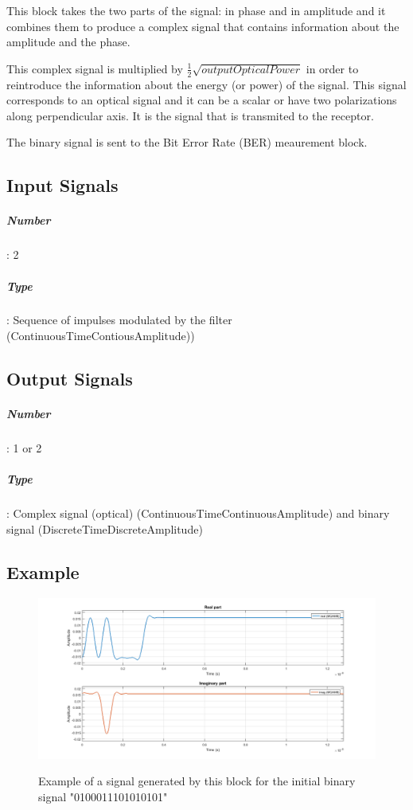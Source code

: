 \documentclass[a4paper]{article}
\begin{document}
This block takes the two parts of the signal: in phase and in amplitude and it combines them to produce a complex signal that contains information about the amplitude and the phase.

This complex signal is multiplied by $\frac{1}{2}\sqrt{\textit{outputOpticalPower}}$ in order to reintroduce the information about the energy (or power) of the signal. This signal corresponds to an optical signal and it can be a scalar or have two polarizations along perpendicular axis. It is the signal that is transmited to the receptor. 

The binary signal is sent to the Bit Error Rate (BER) meaurement block.

\subsection*{Input Signals}

\subparagraph*{Number}: 2

\subparagraph*{Type}: Sequence of impulses modulated by the filter (ContinuousTimeContiousAmplitude))

\subsection*{Output Signals}

\subparagraph*{Number}: 1 or 2

\subparagraph*{Type}: Complex signal (optical) (ContinuousTimeContinuousAmplitude) and binary signal (DiscreteTimeDiscreteAmplitude)

\subsection*{Example}
\begin{figure}[h]
	\centering
	\includegraphics[width=\textwidth]{MQAM8_DeterministicAppendZeros}
	\label{MQAM8_DeterministicAppendZeros}\caption{Example of a signal generated by this block for the initial binary signal "0100011101010101"}
\end{figure}

\end{document}
